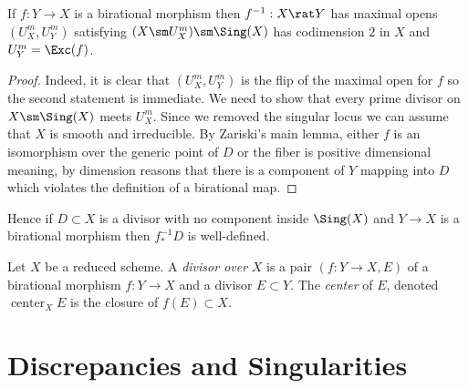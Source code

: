 \documentclass[12pt]{article}
\DeclareMathOperator{\cent}{\mathrm{center}}
\begin{document}
\begin{lemma}
If $f : Y \to X$ is a birational morphism then $f^{-1} : X \rat Y$ has maximal opens $(U_X^m, U_Y^m)$ satisfying $(X \sm U_X^m) \sm \Sing(X)$ has codimension $2$ in $X$ and $U_Y^m = \Exc(f)$.
\end{lemma}

\begin{proof}
Indeed, it is clear that $(U_X^m, U_Y^m)$ is the flip of the maximal open for $f$ so the second statement is immediate. We need to show that every prime divisor on $X \sm \Sing(X)$ meets $U_X^m$. Since we removed the singular locus we can assume that $X$ is smooth and irreducible. By Zariski's main lemma, either $f$ is an isomorphism over the generic point of $D$ or the fiber is positive dimensional meaning, by dimension reasons that there is a component of $Y$ mapping into $D$ which violates the definition of a birational map. 
\end{proof}

\begin{rmk}
Hence if $D \subset X$ is a divisor with no component inside $\Sing(X)$ and $Y \to X$ is a birational morphism then $f^{-1}_* D$ is well-defined. 
\end{rmk}

\begin{defn}
Let $X$ be a reduced scheme. A \textit{divisor over} $X$ is a pair $(f : Y \to X, E)$ of a birational morphism $f : Y \to X$ and a divisor $E \subset Y$. The \textit{center} of $E$, denoted $\cent_X E$ is the closure of $f(E) \subset X$.   
\end{defn}

\section{Discrepancies and Singularities}
\end{document}
